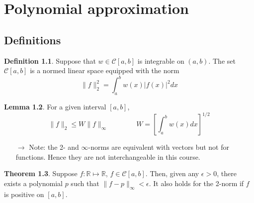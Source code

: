 \documentclass[12pt, openany]{report}
\newcommand{\R}{\mathbb{R}}
\theoremstyle{definition}
\newtheorem{thm}{Theorem}[chapter]
\newtheorem{definition}[thm]{Definition}
\newtheorem{lem}[thm]{Lemma}
\begin{document}
\chapter{Polynomial approximation}
\section{Definitions}
\begin{definition}
    Suppose that $w\in \mathcal{C}[a,b]$ is integrable on $(a,b)$. The set $\mathcal{C}[a,b]$ is a normed linear space equipped with the norm
    \begin{equation}
        \lVert f\rVert_2^2 = \int_a^b w(x)|f(x)|^2dx
    \end{equation}
\end{definition}
\begin{lem}
    For a given interval $[a,b]$,
    \begin{equation}
        \lVert f\rVert_2 \le W\lVert f\rVert_\infty \qquad \qquad W = \left[\int_a^b w(x)dx\right]^{1/2}
    \end{equation}
\end{lem}
\begin{itemize}
    \item [$\rightarrow$] Note: the 2- and $\infty$-norms are equivalent with vectors but not for functions. Hence they are not interchangeable in this course. 
\end{itemize}
\begin{thm}\label{thm:weierstraß}
    Suppose $f:\R\mapsto\R$, $f\in \mathcal{C}[a,b]$. Then, given any $\epsilon>0$, there exists a polynomial $p$ such that $\lVert f-p\rVert_\infty<\epsilon$. It also holds for the 2-norm if $f$ is positive on $[a,b]$.
\end{thm}
\end{document}
